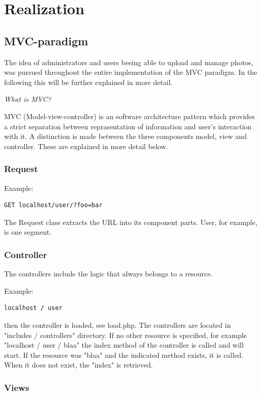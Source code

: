 \documentclass[a4paper,12pt,oneside]{article} %
\begin{document}
\section{Realization}


\subsection{MVC-paradigm}

The idea of administrators and users beeing able to upload and manage photos, 
was pursued throughout the entire implementation of the MVC paradigm.
In the following this will be further explained in more detail. 

\emph{What is MVC?}

MVC (Model-view-controller) is an software architecture pattern which provides a 
strict separation between reprasentation of information and user's interaction with it. 
A distinction is made between the three components model, view and controller. These
are explained in more detail below.


\subsubsection*{Request}

Example: 
\begin{lstlisting}
GET localhost/user/?foo=bar
\end{lstlisting}

The Request class extracts the URL into its component parts. User,
for example, is one segment.


\subsubsection*{Controller}

The controllers include the logic that always belongs to a resource. 

Example: 

\begin{lstlisting}
localhost / user
\end{lstlisting}
then the controller is loaded, see load.php. The controllers are
located in "includes / controllers" directory. If no other resource
is specified, for example "localhost / user / blaa"
the index method of the controller is called and will start. If the resource was
"blaa" and the indicated method exists, it is called. When it does not
exist, the "index" is retrieved.


\subsubsection*{Views}
\end{document}
